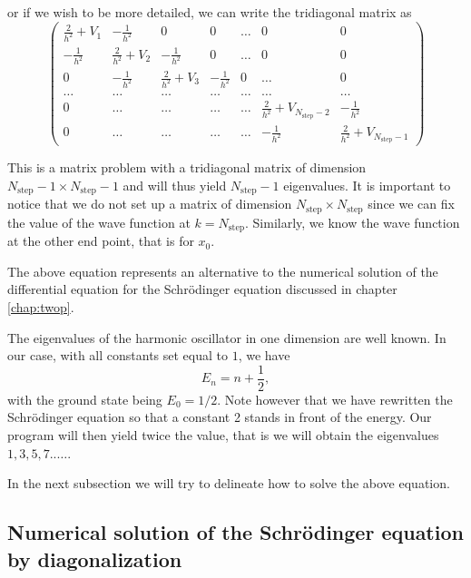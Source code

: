 or if we wish to be more detailed, we can write the tridiagonal matrix as
\begin{equation}
    \left( \begin{array}{ccccccc} \frac{2}{h^2}+V_1 & -\frac{1}{h^2} & 0   & 0    & \dots  &0     & 0 \\
                                -\frac{1}{h^2} & \frac{2}{h^2}+V_2 & -\frac{1}{h^2} & 0    & \dots  &0     &0 \\
                                0   & -\frac{1}{h^2} & \frac{2}{h^2}+V_3 & -\frac{1}{h^2}  &0       &\dots & 0\\
                                \dots  & \dots & \dots & \dots  &\dots      &\dots & \dots\\
                                0   & \dots & \dots & \dots  &\dots       &\frac{2}{h^2}+V_{N_{\mathrm{step}}-2} & -\frac{1}{h^2}\\
                                0   & \dots & \dots & \dots  &\dots       &-\frac{1}{h^2} & \frac{2}{h^2}+V_{N_{\mathrm{step}}-1}

             \end{array} \right)  
\label{eq:matrixse} 
\end{equation} 


This is a matrix problem with a tridiagonal matrix of dimension 
$N_{\mathrm{step}}-1 \times N_{\mathrm{step}}-1$ and will thus yield 
$N_{\mathrm{step}}-1$ eigenvalues. 
It is important to notice that we do not set up a matrix of dimension $N_{\mathrm{step}} \times N_{\mathrm{step}}$
since we can fix the value of the wave function at $k=N_{\mathrm{step}}$.
Similarly, we know the wave function at the other end point, that is for  $x_0$.

The above equation represents an alternative
to the numerical solution of the differential equation for the Schr\"odinger equation discussed
in chapter \ref{chap:twop}.

The eigenvalues of the harmonic oscillator in one dimension are well
known. In our case, with all constants set equal to $1$, we have
\[
   E_n=n+\frac{1}{2},
\]
with the ground state being $E_0=1/2$. Note however that we have rewritten
the Schr\"odinger equation so that a constant 2 stands in front of the energy. Our program will then
yield twice the value, that is we will obtain the eigenvalues 
$1,3,5,7..\dots$. 

In the next subsection we will try to delineate how to solve the above 
equation.

\subsection{Numerical solution of the Schr\"odinger equation by diagonalization}



